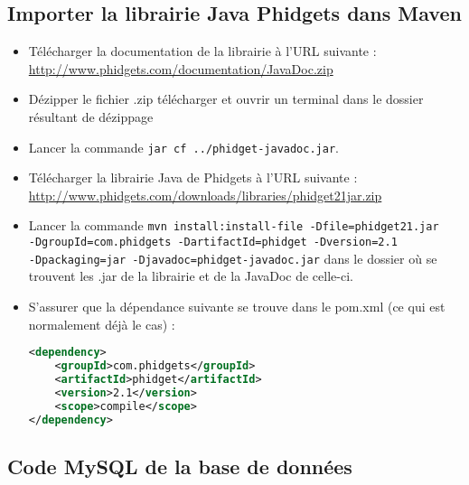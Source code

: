 \subsection{Importer la librairie Java Phidgets dans Maven}
\begin{itemize}
\item Télécharger la documentation de la librairie à l’URL suivante :\\\url{http://www.phidgets.com/documentation/JavaDoc.zip}
\item Dézipper le fichier .zip télécharger et ouvrir un terminal dans le dossier résultant de dézippage
\item Lancer la commande \texttt{jar cf ../phidget-javadoc.jar}.
\item Télécharger la librairie Java de Phidgets à l’URL suivante : \url{http://www.phidgets.com/downloads/libraries/phidget21jar.zip}
\item Lancer la commande \texttt{mvn install:install-file -Dfile=phidget21.jar\\-DgroupId=com.phidgets -DartifactId=phidget -Dversion=2.1\\-Dpackaging=jar -Djavadoc=phidget-javadoc.jar} dans le dossier où se trouvent les .jar de la librairie et de la JavaDoc de celle-ci.
\item S'assurer que la dépendance suivante se trouve dans le pom.xml (ce qui est normalement déjà le cas) :
\begin{lstlisting}[language=XML, numbers=none]
<dependency>
    <groupId>com.phidgets</groupId>
    <artifactId>phidget</artifactId>
    <version>2.1</version>
    <scope>compile</scope>
</dependency>
\end{lstlisting}

\end{itemize}

\subsection{Code MySQL de la base de données}
